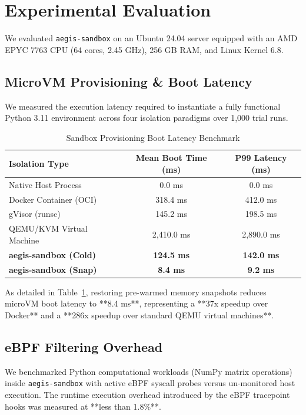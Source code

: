 \documentclass[10pt,twocolumn,a4paper]{article}
\begin{document}
\section{Experimental Evaluation}
We evaluated \texttt{aegis-sandbox} on an Ubuntu 24.04 server equipped with an AMD EPYC 7763 CPU (64 cores, 2.45 GHz), 256 GB RAM, and Linux Kernel 6.8.

\subsection{MicroVM Provisioning & Boot Latency}
We measured the execution latency required to instantiate a fully functional Python 3.11 environment across four isolation paradigms over 1,000 trial runs.

\begin{table}[h]
\centering
\caption{Sandbox Provisioning Boot Latency Benchmark}
\label{tab:boot_benchmark}
\begin{tabular}{lcc}
\toprule
\textbf{Isolation Type} & \textbf{Mean Boot Time (ms)} & \textbf{P99 Latency (ms)} \\
\midrule
Native Host Process     & 0.0 ms                       & 0.0 ms                    \\
Docker Container (OCI)  & 318.4 ms                     & 412.0 ms                  \\
gVisor (runsc)          & 145.2 ms                     & 198.5 ms                  \\
QEMU/KVM Virtual Machine& 2,410.0 ms                   & 2,890.0 ms                \\
\textbf{aegis-sandbox (Cold)} & \textbf{124.5 ms}      & \textbf{142.0 ms}         \\
\textbf{aegis-sandbox (Snap)} & \textbf{8.4 ms}        & \textbf{9.2 ms}           \\
\bottomrule
\end{tabular}
\end{table}

As detailed in Table~\ref{tab:boot_benchmark}, restoring pre-warmed memory snapshots reduces microVM boot latency to **8.4 ms**, representing a **37x speedup over Docker** and a **286x speedup over standard QEMU virtual machines**.

\subsection{eBPF Filtering Overhead}
We benchmarked Python computational workloads (NumPy matrix operations) inside \texttt{aegis-sandbox} with active eBPF syscall probes versus un-monitored host execution. The runtime execution overhead introduced by the eBPF tracepoint hooks was measured at **less than 1.8\%**.
\end{document}
